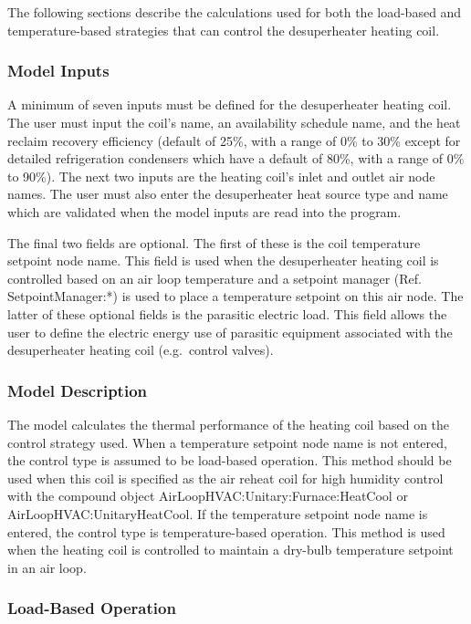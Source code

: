 The following sections describe the calculations used for both the load-based and temperature-based strategies that can control the desuperheater heating coil.

\subsubsection{Model Inputs}\label{model-inputs-4}

A minimum of seven inputs must be defined for the desuperheater heating coil. The user must input the coil's name, an availability schedule name, and the heat reclaim recovery efficiency (default of 25\%, with a range of 0\% to 30\% except for detailed refrigeration condensers which have a default of 80\%, with a range of 0\% to 90\%). The next two inputs are the heating coil's inlet and outlet air node names. The user must also enter the desuperheater heat source type and name which are validated when the model inputs are read into the program.

The final two fields are optional. The first of these is the coil temperature setpoint node name. This field is used when the desuperheater heating coil is controlled based on an air loop temperature and a setpoint manager (Ref. SetpointManager:*) is used to place a temperature setpoint on this air node. The latter of these optional fields is the parasitic electric load. This field allows the user to define the electric energy use of parasitic equipment associated with the desuperheater heating coil (e.g.~control valves).

\subsubsection{Model Description}\label{model-description-6}

The model calculates the thermal performance of the heating coil based on the control strategy used. When a temperature setpoint node name is not entered, the control type is assumed to be load-based operation. This method should be used when this coil is specified as the air reheat coil for high humidity control with the compound object AirLoopHVAC:Unitary:Furnace:HeatCool or AirLoopHVAC:UnitaryHeatCool. If the temperature setpoint node name is entered, the control type is temperature-based operation. This method is used when the heating coil is controlled to maintain a dry-bulb temperature setpoint in an air loop.

\subsubsection{Load-Based Operation}\label{load-based-operation}

